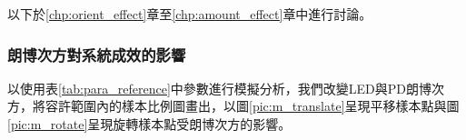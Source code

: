 以下於\ref{chp:orient_effect}章至\ref{chp:amount_effect}章中進行討論。



\subsubsection{朗博次方對系統成效的影響}
\label{chp:m_effect}

以使用表\ref{tab:para_reference}中參數進行模擬分析，我們改變LED與PD朗博次方，將容許範圍內的樣本比例圖畫出，以圖\ref{pic:m_translate}呈現平移樣本點與圖\ref{pic:m_rotate}呈現旋轉樣本點受朗博次方的影響。


